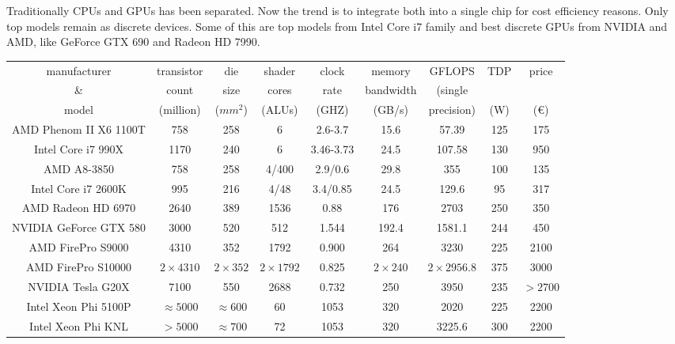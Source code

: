 \documentclass[prodmode,acmtecs]{acmsmall}
\begin{document}
Traditionally CPUs and GPUs has been separated. Now the trend is to integrate both into a single chip for cost efficiency reasons. Only top models remain as discrete devices. Some of this are top models from Intel Core i7 family and best discrete GPUs from  NVIDIA and AMD, like GeForce GTX 690 and Radeon HD 7990.

\begin{table}[h]
{
\begin{tabular}{|c|c|c|c|c|c|c|c|c|}
\hline
manufacturer           & transistor    & die          & shader        & clock      & memory       & GFLOPS          & TDP & price   \\
\&                     & count         & size         & cores         & rate       & bandwidth    & (single         &     &         \\
model                  & (million)     & ($mm^2$)     & (ALUs)        & (GHZ)      & (GB/s)       & precision)      & (W) & (\euro) \\
\hline
\hline
AMD Phenom II X6 1100T & 758           & 258          & 6             & 2.6-3.7    & 15.6         & 57.39           & 125 & 175     \\
\hline
Intel Core i7 990X     & 1170          & 240          & 6             & 3.46-3.73  & 24.5         & 107.58          & 130 & 950     \\
\hline
\hline
AMD A8-3850            & 758           & 258          & 4/400         & 2.9/0.6    & 29.8         & 355             & 100 & 135     \\
\hline
Intel Core i7 2600K    & 995           & 216          & 4/48          & 3.4/0.85   & 24.5         & 129.6           & 95  & 317     \\
\hline
\hline
AMD Radeon HD 6970     & 2640          & 389          & 1536          & 0.88       & 176          & 2703            & 250 & 350     \\
\hline
NVIDIA GeForce GTX 580 & 3000          & 520          & 512           & 1.544      & 192.4        & 1581.1          & 244 & 450     \\
\hline
\hline
AMD FirePro S9000      & 4310          & 352          & 1792          & 0.900      & 264          & 3230            & 225 & 2100    \\
\hline
AMD FirePro S10000     & $2\times4310$ & $2\times352$ & $2\times1792$ & 0.825      & $2\times240$ & $2\times2956.8$ & 375 & 3000    \\
\hline
NVIDIA Tesla G20X      & 7100          & 550          & 2688          & 0.732      & 250          & 3950            & 235 & $>2700$ \\
\hline
\hline
Intel Xeon Phi 5100P   & $\approx5000$ & $\approx600$ & 60            & 1053       & 320          & 2020            & 225 &  2200   \\
\hline
Intel Xeon Phi KNL     & $>5000$       & $\approx700$ & 72            & 1053       & 320          & 3225.6          & 300 &  2200   \\
\hline


\end{tabular}}
\end{table}
\end{document}
